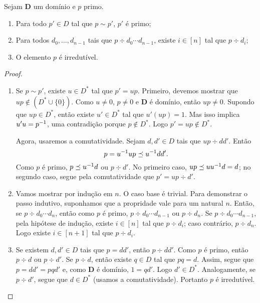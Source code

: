 \begin{prop}
Sejam $\bm D$ um domínio e $p$ primo.
	\begin{enumerate}
	\item Para todo $p' \in D$ tal que $p \sim p'$, $p'$ é primo;
	\item Para todos $d_0,\ldots,d_{n-1}$ tais que $p \div d_0 \cdots d_{n-1}$, existe $i \in [n]$ tal que $p \div d_i$;
	\item O elemento $p$ é irredutível.
	\end{enumerate}
\end{prop}
\begin{proof}
	\begin{enumerate}
	\item Se $p \sim p'$, existe $u \in D^*$ tal que $p'=up$. Primeiro, devemos mostrar que $up \notin (D^* \cup \{0\})$. Como $u \neq 0$, $p \neq 0$ e $\bm D$ é domínio, então $up \neq 0$. Supondo que $up \in D^*$, então existe $u' \in D^*$ tal que $u'(up)=1$. Mas isso implica $u'u=p^{-1}$, uma contradição porque $p \notin D^*$. Logo $p'=up \notin D^*$.
	
Agora, usaremos a comutatividade. Sejam $d,d' \in D$ tais que $up \div dd'$. Então
	\begin{equation*}
	p = u^{-1} up \preceq u^{-1} dd'.
	\end{equation*}
Como $p$ é primo, $p \preceq u^{-1} d$ ou $p \div d'$. No primeiro caso, $up \preceq uu^{-1} d=d$; no segundo caso, segue pela comutatividade que $p'=up \div d'$.
	
	\item Vamos mostrar por indução em $n$. O caso base é trivial. Para demonstrar o passo indutivo, suponhamos que a propridade vale para um natural $n$. Então, se $p \div d_0 \cdots d_n$, então como $p$ é primo, $p \div d_0 \cdots d_{n-1}$ ou $p \div d_n$. Se $p \div d_0 \cdots d_{n-1}$, pela hipótese de indução, existe $i \in [n]$ tal que $p \div d_i$; caso contrário, $p \div d_n$. Logo existe $i \in [n+1]$ tal que $p \div d_i$.
	
	\item Se existem $d,d' \in D$ tais que $p=dd'$, então $p \div dd'$. Como $p$ é primo, então $p \div d$ ou $p \div d'$. Se $p \div d$, então existe $q \in D$ tal que $pq=d$. Assim, segue que $p=dd'=pqd'$ e, como $\bm D$ é domínio, $1=qd'$. Logo $d' \in D^*$. Analogamente, se $p \div d'$, segue que $d \in D^*$ (usamos a comutatividade). Portanto $p$ é irredutível.
	\end{enumerate}
\end{proof}

